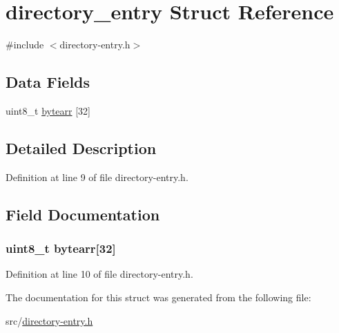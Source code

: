 \hypertarget{structdirectory__entry}{\section{directory\-\_\-entry Struct Reference}
\label{structdirectory__entry}
}


{\ttfamily \#include $<$directory-\/entry.\-h$>$}

\subsection*{Data Fields}
\begin{DoxyCompactItemize}
\item 
uint8\-\_\-t \hyperlink{structdirectory__entry_a380aef5511e7e06c9677a3ef970b32bc}{bytearr} \mbox{[}32\mbox{]}
\end{DoxyCompactItemize}


\subsection{Detailed Description}


Definition at line 9 of file directory-\/entry.\-h.



\subsection{Field Documentation}
\hypertarget{structdirectory__entry_a380aef5511e7e06c9677a3ef970b32bc}{
\subsubsection[{bytearr}]{\setlength{\rightskip}{0pt plus 5cm}uint8\-\_\-t bytearr\mbox{[}32\mbox{]}}}\label{structdirectory__entry_a380aef5511e7e06c9677a3ef970b32bc}


Definition at line 10 of file directory-\/entry.\-h.



The documentation for this struct was generated from the following file\-:\begin{DoxyCompactItemize}
\item 
src/\hyperlink{directory-entry_8h}{directory-\/entry.\-h}\end{DoxyCompactItemize}
